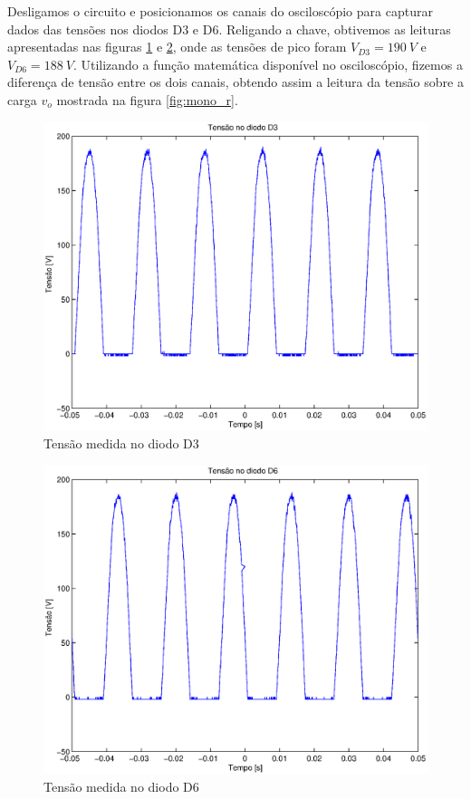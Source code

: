 \documentclass{report}
\begin{document}
Desligamos o circuito e posicionamos os canais do osciloscópio para capturar dados das tensões nos diodos D3 e D6. Religando a chave, obtivemos as leituras apresentadas nas figuras \ref{fig:mono_d3} e \ref{fig:mono_d6}, onde as tensões de pico foram $V_{D3}=190\ V$ e $V_{D6}=188\ V$. Utilizando a função matemática disponível no osciloscópio, fizemos a diferença de tensão entre os dois canais, obtendo assim a leitura da tensão sobre a carga $v_o$ mostrada na figura \ref{fig:mono_r}.

\begin{figure}[H]
	\centering
	\includegraphics[width=\linewidth]{dados/monofasico/mono_d3}
	\caption{Tensão medida no diodo D3}
	\label{fig:mono_d3}
\end{figure}

\begin{figure}[H]
	\centering
	\includegraphics[width=\linewidth]{dados/monofasico/mono_d6}
	\caption{Tensão medida no diodo D6}
	\label{fig:mono_d6}
\end{figure}
\end{document}
